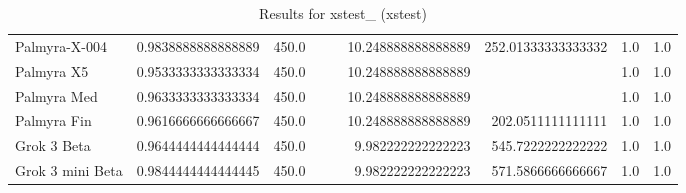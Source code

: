 \begin{table}[htp]
{\begin{tabular}{lrrrrrrrr}
Palmyra-X-004 & 0.9838888888888889 & 450.0 &  &  & 10.248888888888889 & 252.01333333333332 & 1.0 & 1.0 \\
Palmyra X5 & 0.9533333333333334 & 450.0 &  &  & 10.248888888888889 &  & 1.0 & 1.0 \\
Palmyra Med & 0.9633333333333334 & 450.0 &  &  & 10.248888888888889 &  & 1.0 & 1.0 \\
Palmyra Fin & 0.9616666666666667 & 450.0 &  &  & 10.248888888888889 & 202.0511111111111 & 1.0 & 1.0 \\
Grok 3 Beta & 0.9644444444444444 & 450.0 &  &  & 9.982222222222223 & 545.7222222222222 & 1.0 & 1.0 \\
Grok 3 mini Beta & 0.9844444444444445 & 450.0 &  &  & 9.982222222222223 & 571.5866666666667 & 1.0 & 1.0 \\
\bottomrule
\end{tabular}}
\caption{Results for xstest_ (xstest)}
\label{fig:xstest_ (xstest)}
\end{table}
